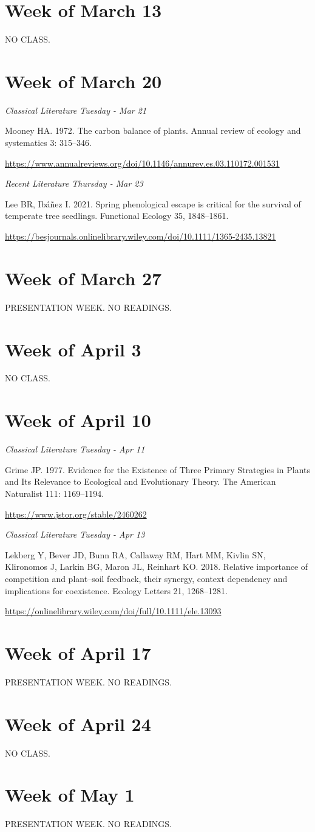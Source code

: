 \documentclass[12pt, notitlepage]{article}   	%
\begin{document}
{\section*{Week of March 13}
NO CLASS.

\section*{Week of March 20}
\textit{Classical Literature Tuesday - Mar 21} \par
Mooney HA. 1972. The carbon balance of plants. 
Annual review of ecology and systematics 3: 315–346. \par
\url{https://www.annualreviews.org/doi/10.1146/annurev.es.03.110172.001531}

\textit{Recent Literature Thursday - Mar 23} \par
Lee BR, Ibáñez I. 2021. Spring phenological escape is critical for the survival of 
temperate tree seedlings. Functional Ecology 35, 1848–1861. \par
\url{https://besjournals.onlinelibrary.wiley.com/doi/10.1111/1365-2435.13821}

\section*{Week of March 27}
PRESENTATION WEEK. NO READINGS.

\section*{Week of April 3}
NO CLASS.

\section*{Week of April 10}
\textit{Classical Literature Tuesday - Apr 11} \par
Grime JP. 1977. Evidence for the Existence of Three Primary Strategies in Plants and Its 
Relevance to Ecological and Evolutionary Theory. 
The American Naturalist 111: 1169–1194. \par
\url{https://www.jstor.org/stable/2460262}

\textit{Classical Literature Tuesday - Apr 13} \par
Lekberg Y, Bever JD, Bunn RA, Callaway RM, Hart MM, Kivlin SN, Klironomos J, Larkin BG, 
Maron JL, Reinhart KO. 2018. Relative importance of competition and plant–soil feedback, 
their synergy, context dependency and implications for coexistence. Ecology Letters 21, 1268–1281. \par
\url{https://onlinelibrary.wiley.com/doi/full/10.1111/ele.13093}

\section*{Week of April 17}
PRESENTATION WEEK. NO READINGS.

\section*{Week of April 24}
NO CLASS.

\section*{Week of May 1}
PRESENTATION WEEK. NO READINGS.

} %
\end{document}
